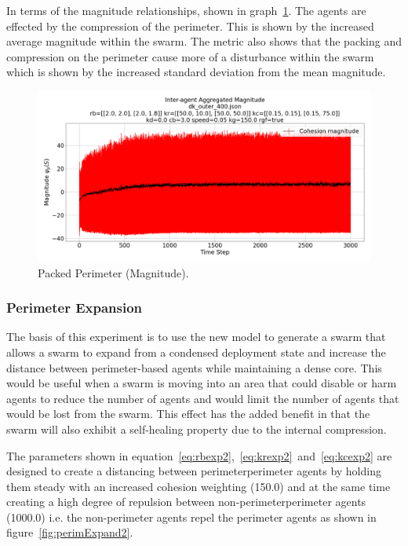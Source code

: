 \documentclass[12pt,a4paper]{IEEEtran}
\begin{document}
In terms of the magnitude relationships, shown in graph~\ref{fig:tightPerimMagnitude}. The agents are effected by the compression of the perimeter. This is shown by the increased average magnitude within the swarm. The metric also shows that the packing and compression on the perimeter cause more of a disturbance within the swarm which is shown by the increased standard deviation from the mean magnitude.

\begin{figure}[H]
	\begin{center}
		\includegraphics[width=1.0\linewidth]{figures/tightPerimMagnitude}
	\end{center}
	\caption{Packed Perimeter (Magnitude). \label{fig:tightPerimMagnitude}}
\end{figure}

\subsubsection{Perimeter Expansion}
The basis of this experiment is to use the new model to generate a swarm that allows a swarm to expand from a condensed deployment state and increase the distance between perimeter-based agents while maintaining a dense core. This would be useful when a swarm is moving into an area that could disable or harm agents to reduce the number of agents and would limit the number of agents that would be lost from the swarm. This effect has the added benefit in that the swarm will also exhibit a self-healing property due to the internal compression.

The parameters shown in equation~\ref{eq:rbexp2},~\ref{eq:krexp2}~and~\ref{eq:kcexp2} are designed to create a distancing between perimeter\textrightarrow perimeter agents by holding them steady with an increased cohesion weighting (150.0) and at the same time creating a high degree of repulsion between non-perimeter\textrightarrow perimeter agents (1000.0) i.e. the non-perimeter agents repel the perimeter agents as shown in figure~\ref{fig:perimExpand2}.
\end{document}
